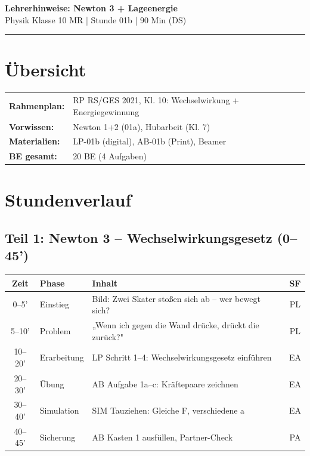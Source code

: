 \documentclass[11pt, a4paper]{article}
\newcommand{\fach}{Physik}
\newcommand{\thema}{Newton 3 + Lageenergie}
\newcommand{\klasse}{10 MR}
\newcommand{\stession}{01b}
\newcommand{\dauer}{90 Min (DS)}
\begin{document}

\begin{center}
    {\Large\bfseries\textcolor{fachfarbe}{Lehrerhinweise: \thema}}\\[0.3em]
    {\small \fach{} Klasse \klasse{} | Stunde \stession{} | \dauer}
\end{center}
\vspace{-0.3em}
\hrule
\vspace{0.8em}


\section*{Übersicht}

\begin{tabularx}{\textwidth}{@{}lX@{}}
\textbf{Rahmenplan:} & RP RS/GES 2021, Kl. 10: Wechselwirkung + Energiegewinnung \\
\textbf{Vorwissen:} & Newton 1+2 (01a), Hubarbeit (Kl. 7) \\
\textbf{Materialien:} & LP-01b (digital), AB-01b (Print), Beamer \\
\textbf{BE gesamt:} & 20 BE (4 Aufgaben) \\
\end{tabularx}


\section*{Stundenverlauf}

\subsection*{Teil 1: Newton 3 – Wechselwirkungsgesetz (0–45')}

\begin{tabularx}{\textwidth}{@{}c|l|X|c@{}}
\toprule
\textbf{Zeit} & \textbf{Phase} & \textbf{Inhalt} & \textbf{SF} \\
\midrule
0–5' & Einstieg & Bild: Zwei Skater stoßen sich ab – wer bewegt sich? & PL \\
5–10' & Problem & „Wenn ich gegen die Wand drücke, drückt die zurück?" & PL \\
10–20' & Erarbeitung & LP Schritt 1–4: Wechselwirkungsgesetz einführen & EA \\
20–30' & Übung & AB Aufgabe 1a–c: Kräftepaare zeichnen & EA \\
30–40' & Simulation & SIM Tauziehen: Gleiche F, verschiedene a & EA \\
40–45' & Sicherung & AB Kasten 1 ausfüllen, Partner-Check & PA \\
\bottomrule
\end{tabularx}
\end{document}
